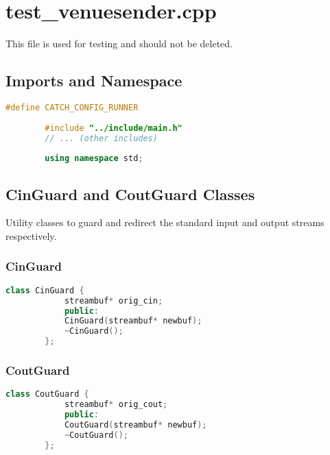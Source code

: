 \documentclass{article}
\begin{document}
	\section{test\_venuesender.cpp}
	
	This file is used for testing and should not be deleted.
	
	\subsection*{Imports and Namespace}
	\begin{mdframed}[backgroundcolor=background, hidealllines=false, innerleftmargin=15pt, innerrightmargin=5pt, innertopmargin=0pt, innerbottommargin=-5pt]
	\begin{lstlisting}[language=C++]
		#define CATCH_CONFIG_RUNNER
		
		#include "../include/main.h"
		// ... (other includes)
		
		using namespace std;
	\end{lstlisting}
\end{mdframed}	
	\subsection*{CinGuard and CoutGuard Classes}
	Utility classes to guard and redirect the standard input and output streams respectively.
	
	\subsubsection*{CinGuard}
	\begin{mdframed}[backgroundcolor=background, hidealllines=false, innerleftmargin=15pt, innerrightmargin=5pt, innertopmargin=0pt, innerbottommargin=-5pt]
	\begin{lstlisting}[language=C++]
		class CinGuard {
			streambuf* orig_cin;
			public:
			CinGuard(streambuf* newbuf);
			~CinGuard();
		};
	\end{lstlisting}
\end{mdframed}
	

	\subsubsection*{CoutGuard}
	\begin{mdframed}[backgroundcolor=background, hidealllines=false, innerleftmargin=15pt, innerrightmargin=5pt, innertopmargin=0pt, innerbottommargin=-5pt]
	\begin{lstlisting}[language=C++]
		class CoutGuard {
			streambuf* orig_cout;
			public:
			CoutGuard(streambuf* newbuf);
			~CoutGuard();
		};
	\end{lstlisting}
	\end{mdframed}
	
\end{document}
